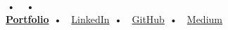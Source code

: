 
\begin{center}
    {\LARGE \bfseries \CVName}\\[3pt]
    \small
    ~\CVLocation \,•\,
    ~\CVPhone \,•\,
    ~\href{mailto:\CVEmailUni}{\CVEmailUni}\\[3pt]
    ~\href{\CVPortfolioURL}{\textbf{Portfolio}} \,•\,
    ~\href{\CVLinkedinURL}{LinkedIn} \,•\,
    ~\href{\CVGithubURL}{GitHub} \,•\,
    ~\href{\CVMediumURL}{Medium}
\end{center}
\vspace{-0.6em}
